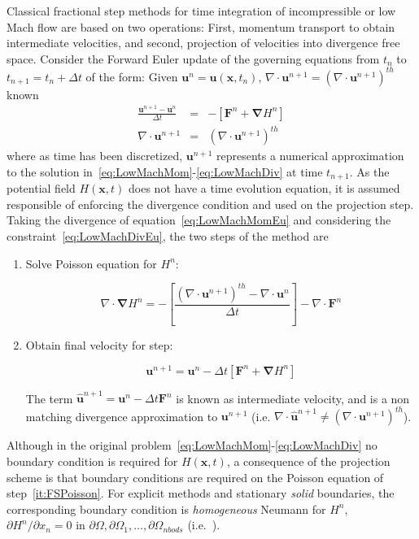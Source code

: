 \documentclass[12pt]{article}
\begin{document}
Classical fractional step methods for time integration of incompressible or low Mach flow are based on two operations: First, momentum transport to obtain intermediate velocities, and second, projection of velocities into divergence free space. Consider the Forward Euler update of the governing equations from $t_n$ to $t_{n+1}=t_n + \Delta t$ of the form: Given $ \mathbf{u}^n=\mathbf{u}(\mathbf{x},t_n)$, $\nabla \cdot \mathbf{u}^{n+1} = \left( \nabla \cdot \mathbf{u}^{n+1} \right)^{th}$ known
%
\begin{eqnarray}
  \frac{\mathbf{u}^{n+1}-\mathbf{u}^{n}}{\Delta t} &=& - \left[ \mathbf{F}^n +  \boldsymbol{\nabla} H^n \right] \label{eq:LowMachMomEu}\\
  \nabla \cdot \mathbf{u}^{n+1} &=& \left( \nabla \cdot \mathbf{u}^{n+1} \right)^{th} \label{eq:LowMachDivEu}
\end{eqnarray}
%
where as time has been discretized, $\mathbf{u}^{n+1}$ represents a numerical approximation to the solution in~\eqref{eq:LowMachMom}-\eqref{eq:LowMachDiv} at time $t_{n+1}$. As the potential field $H(\mathbf{x},t)$ does not have a time evolution equation, it is assumed responsible of enforcing the divergence condition and used on the projection step. Taking the divergence of equation~\eqref{eq:LowMachMomEu} and considering  the constraint~\eqref{eq:LowMachDivEu}, the two steps of the method are
%
\begin{enumerate}
  \item Solve Poisson equation for $H^n$:

\begin{equation}
   \nabla \cdot \boldsymbol{\nabla} H^n = - \left[ \frac{\left( \nabla \cdot \mathbf{u}^{n+1} \right)^{th} - \nabla \cdot \mathbf{u}^{n}}{\Delta t} \right] - \nabla \cdot \mathbf{F}^n \label{it:FSPoisson}
\end{equation}

  \item Obtain final velocity for step:

  \begin{equation}
     \mathbf{u}^{n+1} = \mathbf{u}^{n} - \Delta t \left[ \mathbf{F}^n +  \boldsymbol{\nabla} H^n \right] \label{it:FSProject}
   \end{equation}

   The term $\hat{\mathbf{u}}^{n+1}=\mathbf{u}^{n} - \Delta t \mathbf{F}^n$ is known as intermediate velocity, and is a non matching divergence approximation to $\mathbf{u}^{n+1}$ (i.e. $\nabla \cdot \hat{\mathbf{u}}^{n+1} \neq \left( \nabla \cdot \mathbf{u}^{n+1} \right)^{th}$).
\end{enumerate}
%
Although in the original problem~\eqref{eq:LowMachMom}-\eqref{eq:LowMachDiv} no boundary condition is required for $H(\mathbf{x},t)$, a consequence of the projection scheme is that boundary conditions are required on the Poisson equation of step~\eqref{it:FSPoisson}. For explicit methods and stationary \textit{solid} boundaries, the corresponding boundary condition is \textit{homogeneous} Neumann for $H^n$, $\partial H^n / \partial x_n =0$ in $\partial \Omega,\partial \Omega_1,...,\partial \Omega_{nbods}$ (i.e.~\cite{Perot:1993}).
\end{document}
